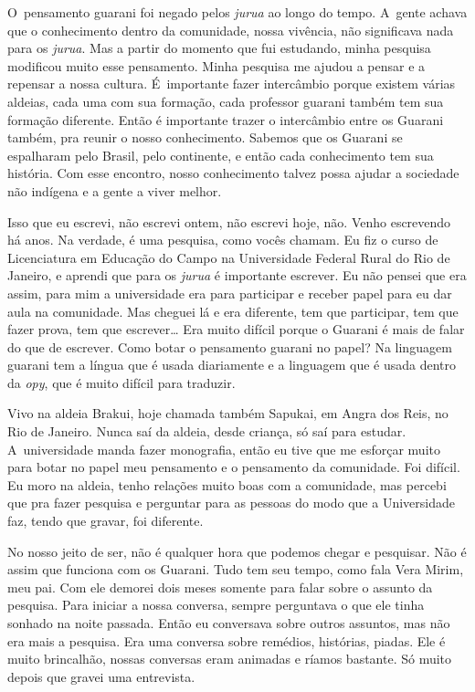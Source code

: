 O~pensamento guarani foi negado pelos \emph{jurua} ao longo do tempo. A~gente
achava que o conhecimento dentro da comunidade, nossa vivência, não
significava nada para os \emph{jurua}. Mas a partir do momento que fui
estudando, minha pesquisa modificou muito esse pensamento. Minha
pesquisa me ajudou a pensar e a repensar a nossa cultura. É~importante
fazer intercâmbio porque existem várias aldeias, cada uma com sua
formação, cada professor guarani também tem sua formação diferente.
Então é importante trazer o intercâmbio entre os Guarani também, pra
reunir o nosso conhecimento. Sabemos que os Guarani se espalharam pelo
Brasil, pelo continente, e então cada conhecimento tem sua história.
Com esse encontro, nosso conhecimento talvez possa ajudar a sociedade
não indígena e a gente a viver melhor.

Isso que eu escrevi, não escrevi ontem, não escrevi hoje, não. Venho
escrevendo há anos. Na verdade, é uma pesquisa, como vocês chamam. Eu
fiz o curso de Licenciatura em Educação do Campo na Universidade
Federal Rural do Rio de Janeiro, e aprendi que para os \emph{jurua} é
importante escrever. Eu não pensei que era assim, para mim a
universidade era para participar e receber papel para eu dar aula na
comunidade. Mas cheguei lá e era diferente, tem que participar, tem que
fazer prova, tem que escrever\ldots{} Era muito difícil porque o Guarani é
mais de falar do que de escrever. Como botar o pensamento guarani no
papel? Na linguagem guarani tem a língua que é usada diariamente e a
linguagem que é usada dentro da \emph{opy}, que é muito difícil para traduzir.

Vivo na aldeia Brakui, hoje chamada também Sapukai, em Angra dos Reis,
no Rio de Janeiro. Nunca saí da aldeia, desde criança, só saí para
estudar. A~universidade manda fazer monografia, então eu tive que me
esforçar muito para botar no papel meu pensamento e o pensamento da
comunidade. Foi difícil. Eu moro na aldeia, tenho relações muito boas
com a comunidade, mas percebi que pra fazer pesquisa e perguntar para
as pessoas do modo que a Universidade faz, tendo que gravar, foi
diferente.

No nosso jeito de ser, não é qualquer hora que podemos chegar e
pesquisar. Não é assim que funciona com os Guarani. Tudo tem seu tempo,
como fala Vera Mirim, meu pai. Com ele demorei dois meses somente para
falar sobre o assunto da pesquisa. Para iniciar a nossa conversa,
sempre perguntava o que ele tinha sonhado na noite passada. Então eu
conversava sobre outros assuntos, mas não era mais a pesquisa. Era uma
conversa sobre remédios, histórias, piadas. Ele é muito brincalhão,
nossas conversas eram animadas e ríamos bastante. Só muito depois que
gravei uma entrevista. 

